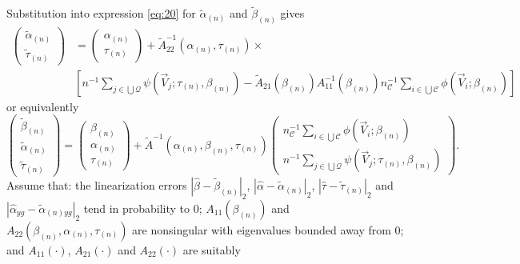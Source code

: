 \documentclass{article}
\begin{document}
Substitution into expression \eqref{eq:20} for
$\tilde{\alpha}_{(n)}$ and $\tilde{\beta}_{(n)}$ gives
\begin{align}
      \left(\begin{array}{c}\tilde{\alpha}_{(n)}\\ \tilde{\tau}_{(n)} \end{array}\right)         &=\left(\begin{array}{c}\alpha_{(n)}\\
                         \tau_{(n)} \end{array}\right) +
    \tilde{A}_{22}^{-1}(\alpha_{(n)}, \tau_{(n)})\times \label{eq:21}\\
    & \left[
                 n^{-1}\sum_{j\in \bigcup
                 \mathcal{Q}}\psi(\vec{V}_{j};
                 \tau_{(n)},\beta_{(n)} ) -
      \tilde{A}_{21}(\beta_{(n)})
      {A}_{11}^{-1}(\beta_{(n)})n_{\mathcal{C}}^{-1}\sum_{i\in \bigcup
      \mathcal{C}}\phi(\vec{V}_{i}; \beta_{(n)})\right] \nonumber
\end{align}
or equivalently
\begin{equation*}
\left(\begin{array}{c}\tilde{\beta}_{(n)}\\ \tilde{\alpha}_{(n)}\\ \tilde{\tau}_{(n)} \end{array}\right)
    = \left(\begin{array}{c}\beta_{(n)} \\\alpha_{(n)}\\
                    \tau_{(n)} \end{array}\right)
    + \tilde{A}^{-1}(\alpha_{(n)}, \beta_{(n)}, \tau_{(n)})\left(
    \begin{array}{c}
      n_{\mathcal{C}}^{-1}\sum_{i\in \bigcup
      \mathcal{C}}\phi(\vec{V}_{i}; \beta_{(n)})\\
      n^{-1}\sum_{j\in \bigcup
                 \mathcal{Q}}\psi(\vec{V}_{j};
                 \tau_{(n)},\beta_{(n)} )
    \end{array}
\right).
\end{equation*}
Assume that: the linearization errors $|\hat\beta -\tilde{\beta}_{(n)}|_{2}$,
$|\hat{\alpha} - \tilde{\alpha}_{(n)}|_{2}$, $|\hat\tau -\tilde{\tau}_{(n)}|_{2}$ and $|\hat{\alpha}_{yg} - \tilde{\alpha}_{(n)yg}|_{2}$ tend in probability to 0;
$A_{11}(\beta_{(n)})$ and $A_{22}(\beta_{(n)}, \alpha_{(n)}, \tau_{(n)})$ are nonsingular
with eigenvalues bounded away from 0; and $A_{11}(\cdot)$, $A_{21}(\cdot)$ and $A_{22}(\cdot)$ are suitably
\end{document}
